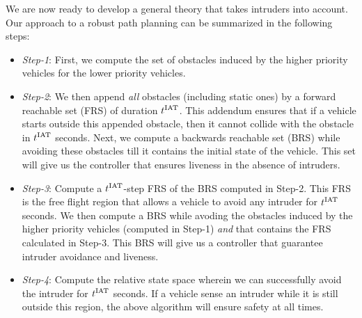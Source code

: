 We are now ready to develop a general theory that takes intruders into account. Our approach to a robust path planning can be summarized in the following steps:
\begin{itemize}
\item \textit{Step-1}: First, we compute the set of obstacles induced by the higher priority vehicles for the lower priority vehicles.  
\item \textit{Step-2}: We then append \textit{all} obstacles (including static ones) by a forward reachable set (FRS) of duration $t^\text{IAT}$. This addendum ensures that if a vehicle starts outside this appended obstacle, then it cannot collide with the obstacle in $t^\text{IAT}$ seconds. Next, we compute a backwards reachable set (BRS) while avoiding these obstacles till it contains the initial state of the vehicle. This set will give us the controller that ensures liveness in the absence of intruders. 
\item \textit{Step-3}: Compute a $t^\text{IAT}$-step FRS of the BRS computed in Step-2. This FRS is the free flight region that allows a vehicle to avoid any intruder for $t^\text{IAT}$ seconds. We then compute a BRS while avoding the obstacles induced by the higher priority vehicles (computed in Step-1) \textit{and} that contains the FRS calculated in Step-3. This BRS will give us a controller that guarantee intruder avoidance and liveness. 
\item \textit{Step-4}: Compute the relative state space wherein we can successfully avoid the intruder for $t^\text{IAT}$ seconds. If a vehicle sense an intruder while it is still outside this region, the above algorithm will ensure safety at all times.  
\end{itemize}

%
%

